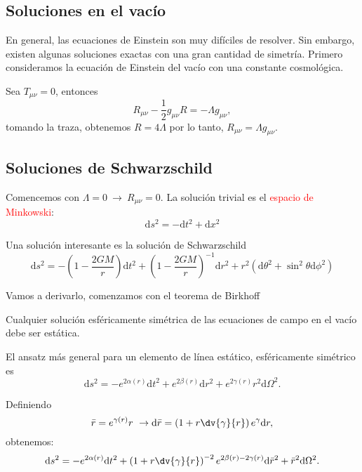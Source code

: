 \documentclass[../main]{subfiles}
\begin{document}
\begin{adjustwidth}{0pt}{-100pt}
\section{Soluciones en el vacío}\label{part5.5}

En general, las ecuaciones de Einstein son muy difíciles de resolver. Sin embargo, existen algunas soluciones exactas con una gran cantidad de simetría. Primero consideramos la ecuación de Einstein del vacío con una constante cosmológica.

Sea $T_{\mu\nu}=0$, entonces 
\begin{equation}
    R_{\mu\nu}-\dfrac{1}{2}g_{\mu\nu}R=-\Lambda g_{\mu\nu},
\end{equation}
tomando la traza, obtenemos $R=4\Lambda$ por lo tanto, $R_{\mu\nu} = \Lambda g_{\mu\nu}$.

\subsection{Soluciones de Schwarzschild}

Comencemos con $\Lambda = 0 \ \rightarrow \ R_{\mu\nu}=0$. La solución trivial es el \textcolor{red}{espacio de Minkowski}:
\begin{equation}
    \mathrm{d}s^2=-\mathrm{d}t^2+\mathrm{d}x^2
\end{equation}

Una solución interesante es la solución de Schwarzschild
\begin{equation}
    \mathrm{d}s^2 = -\left(1-\dfrac{2GM}{r}\right)\mathrm{d}t^2+\left(1-\dfrac{2GM}{r}\right)^{-1}\mathrm{d}r^2+r^2(\mathrm{d}\theta^2+\sin^2 \theta \mathrm{d}\phi^2)
\end{equation}

Vamos a derivarlo, comenzamos con el teorema de Birkhoff

 Cualquier solución esféricamente simétrica de las ecuaciones de campo en el vacío debe ser estática.

El ansatz más general para un elemento de línea estático, esféricamente simétrico es 
\begin{equation}
    \mathrm{d}s^2= -e^{2\alpha(r)}\mathrm{d}t^2+e^{2\beta(r)}\mathrm{d}r^2+e^{2\gamma(r)}r^2\mathrm{d}\Omega^2.
\end{equation}

Definiendo
\begin{equation}
    \bar{r}=e^{\gamma(r)}r \ \rightarrow \mathrm{d}\bar{r}=\left(1+r\dv{\gamma}{r}\right)e^{\gamma}\mathrm{d}r,
\end{equation}
obtenemos:
\begin{equation}
    \mathrm{d}s^2=-e^{2\alpha(r)}\mathrm{d}t^2+\left(1+r\dv{\gamma}{r}\right)^{-2}e^{2\beta(r)-2\gamma(r)}\mathrm{d}\bar{r}^2+\bar{r}^2\mathrm{d}\Omega^2.
\end{equation}


\end{adjustwidth}
\end{document}
